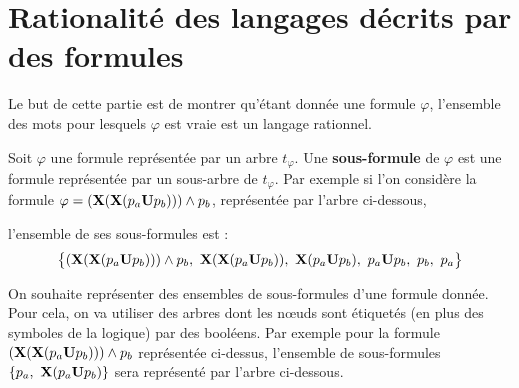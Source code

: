\newpage
\section{Rationalité des langages décrits par des formules}
Le but de cette partie est de montrer qu'étant donnée une formule $\varphi$, l'ensemble des mots pour lesquels $\varphi$ est vraie est un langage rationnel.

\smallbreak

Soit $\varphi$ une formule représentée par un arbre $t_\varphi$. Une {\bf sous-formule} de $\varphi$ est une formule représentée par un sous-arbre de $t_\varphi$. Par exemple si l'on considère la formule $\varphi=({\bf X}({\bf X}(p_a {\bf U} p_b)))\wedge p_b$, représentée par l'arbre ci-dessous,
\begin{center}
\end{center}
l'ensemble de ses sous-formules est :
\[\bigl\{({\bf X}({\bf X}(p_a{\bf U} p_b)))\wedge p_b,\ {\bf X}({\bf X}(p_a{\bf U} p_b)),\ {\bf X}(p_a{\bf U} p_b),\ p_a{\bf U} p_b,\ p_b,\ p_a \bigr\}\]

On souhaite représenter des ensembles de sous-formules d'une formule donnée. Pour cela, on va utiliser des arbres dont les nœuds sont étiquetés (en plus des symboles de la logique) par des booléens. Par exemple pour la formule $({\bf X}({\bf X}(p_a {\bf U} p_b))) \wedge p_b$ représentée ci-dessus, l'ensemble de sous-formules $\{p_a,\ {\bf X}(p_a {\bf U} p_b)\}$ sera représenté par l'arbre ci-dessous.
\begin{center}
\end{center}

